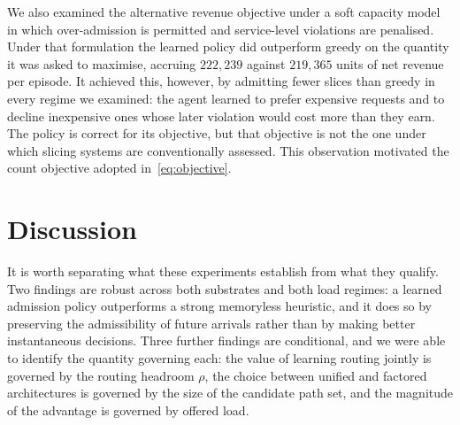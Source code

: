 \documentclass[10pt,journal,comsoc]{IEEEtran}
\begin{document}
We also examined the alternative revenue objective under a soft capacity
model in which over-admission is permitted and service-level violations
are penalised. Under that formulation the learned policy did outperform
greedy on the quantity it was asked to maximise, accruing $222{,}239$
against $219{,}365$ units of net revenue per episode. It achieved this,
however, by admitting fewer slices than greedy in every regime we
examined: the agent learned to prefer expensive requests and to decline
inexpensive ones whose later violation would cost more than they earn.
The policy is correct for its objective, but that objective is not the
one under which slicing systems are conventionally assessed. This
observation motivated the count objective adopted
in~\eqref{eq:objective}.

\section{Discussion} \label{discussion}
It is worth separating what these experiments establish from what they
qualify. Two findings are robust across both substrates and both load
regimes: a learned admission policy outperforms a strong memoryless
heuristic, and it does so by preserving the admissibility of future
arrivals rather than by making better instantaneous decisions. Three
further findings are conditional, and we were able to identify the
quantity governing each: the value of learning routing jointly is
governed by the routing headroom $\rho$, the choice between unified and
factored architectures is governed by the size of the candidate path
set, and the magnitude of the advantage is governed by offered load.
\end{document}
